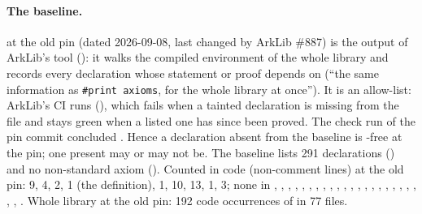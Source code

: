 \paragraph{The baseline.} \allowbreak{} at the old pin (dated 2026-09-08,
last changed by ArkLib \#887) is the output of ArkLib's  tool
(\allowbreak{}): it walks the compiled environment of the whole library and
records every declaration whose statement or proof depends on  (\enquote{the same
information as \texttt{\#print axioms}, for the whole library at once}). It is an allow-list: ArkLib's
CI runs  (\allowbreak{}\allowbreak{}), which fails
when a tainted declaration is missing from the file and stays green when a listed one has since
been proved. The  check run of the pin commit concluded . Hence a
declaration absent from the baseline is -free at the pin; one present may or may
not be. The baseline lists 291 declarations () and no non-standard axiom
(). Counted  in code (non-comment lines) at the old pin:
\allowbreak{} 9, \allowbreak{} 4,  2,
 1 (the  definition), \allowbreak{} 1,
\allowbreak{} 10, \allowbreak{}\allowbreak{} 13,
\allowbreak{} 1,  3; none in
\allowbreak{}, , , ,
, \allowbreak{},
\allowbreak{}, \allowbreak{}, \allowbreak{},
\allowbreak{}, \allowbreak{},
, , ,
\allowbreak{}, \allowbreak{}\allowbreak{},
\allowbreak{}, \allowbreak{},
\allowbreak{}, \allowbreak{},
\allowbreak{}\allowbreak{}, , ,
. Whole library at the old pin: 192 code occurrences of
 in 77 files.

